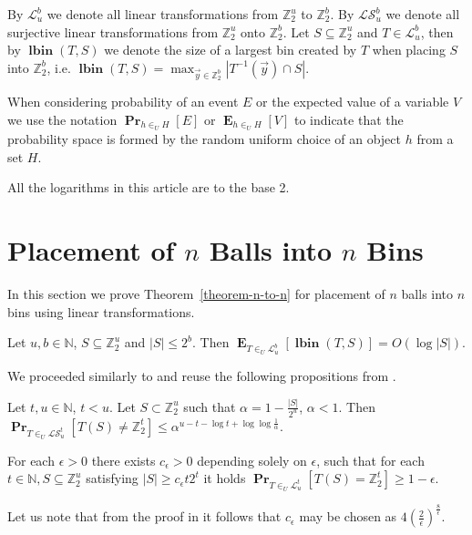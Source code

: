 \documentclass[unicode,review]{siamart1116}
\newcommand{\lbin}[2]{\operatorname{\mathbf{lbin}}({#1}, {#2})}
\newcommand{\vecspace}[2]{\mathbb{Z}_{#1}^{#2}}
\newcommand{\binvecspace}[1]{\vecspace{2}{#1}}
\newcommand{\linearmaps}[2]{\mathcal{L}_{#1}^{#2}}
\newcommand{\surjectivelinearmaps}[2]{\mathcal{LS}_{#1}^{#2}}
\newcommand{\probs}[2]{\operatorname{\mathbf{Pr}}_{{#1}}\left[{#2}\right]}
\newcommand{\expects}[2]{\operatorname{\mathbf{E}}_{{#1}}\left[{#2}\right]}
\numberwithin{theorem}{section}
\begin{document}
By $\linearmaps{u}{b}$ we denote all linear transformations from $\binvecspace{u}$ to $\binvecspace{b}$.
By $\surjectivelinearmaps{u}{b}$ we denote all surjective linear transformations from $\binvecspace{u}$ onto $\binvecspace{b}$.
Let $S \subseteq \binvecspace{u}$ and $T \in \linearmaps{u}{b}$, then by $\lbin{T}{S}$ we denote the size of a largest bin created by $T$ when placing $S$ into $\binvecspace{b}$, i.e. $\lbin{T}{S} = \operatorname{max}_{\vec y \in \binvecspace{b}} |T^{-1}(\vec y) \cap S|$.

When considering probability of an event $E$ or the expected value of a variable $V$ we use the notation $\probs{h \in_U H}{E}$ or $\expects{h \in_U H}{V}$ to indicate that the probability space is formed by the random uniform choice of an object $h$ from a set $H$.

All the logarithms in this article are to the base 2.

\section{Placement of \texorpdfstring{$n$}{n} Balls into \texorpdfstring{$n$}{n} Bins}

In this section we prove Theorem~\ref{theorem-n-to-n} for placement of $n$ balls into $n$ bins using linear transformations.
\begin{theorem}
\label{theorem-n-to-n}
Let $u, b \in \mathbb{N}$, $S \subseteq \binvecspace{u}$ and $|S| \leq 2^b$. Then $\expects{T \in_U \linearmaps{u}{b}}{\lbin{T}{S}} = O(\log |S|)$.
\end{theorem}

We proceeded similarly to \cite{alonetal} and reuse the following propositions from \cite{alonetal}.
\begin{proposition}
\label{proposition-prob-bound}
Let $t, u \in \mathbb{N}$, $t < u$.
Let $S \subset \binvecspace{u}$ such that $\alpha = 1 - \frac{|S|}{2^u}$, $\alpha < 1$.
Then $\probs{T \in_U \surjectivelinearmaps{u}{t}}{T(S) \neq \binvecspace{t}} \leq \alpha^{u - t - \log t + \log \log \frac{1}{\alpha}}$.
\end{proposition}

\begin{proposition}
\label{proposition-epsilon}
For each $\epsilon > 0$ there exists $c_\epsilon > 0$ depending solely on $\epsilon$, such that for each $t \in \mathbb{N}, S \subseteq \binvecspace{u}$ satisfying $|S| \geq c_\epsilon t 2^t$ it holds $\probs{T \in_U \linearmaps{u}{t}}{T(S) = \binvecspace{t}} \geq 1 - \epsilon$.
\end{proposition}
Let us note that from the proof in \cite{alonetal} it follows that $c_\epsilon$ may be chosen as $4\left(\frac{2}{\epsilon}\right)^{\frac{8}{\epsilon}}$.
\end{document}
